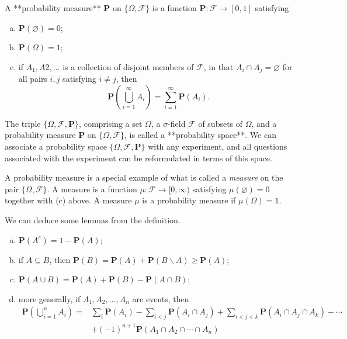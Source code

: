 \begin{definition}
A **probability measure** $\mathbf{P}$ on $\{ \Omega, \mathcal{F} \}$ is a function $\mathbf{P} : \mathcal{F} \to [0,1]$ satisfying
\begin{enumerate}[(a)]
    \item $\mathbf{P}(\varnothing) = 0$;
    \item $\mathbf{P}(\Omega) = 1$;
    \item  if $A_1, A2, \dots$ is a collection of disjoint members of $\mathcal{F}$, in that $A_i \cap A_j = \varnothing$ for all pairs $i, j$ satisfying $i \neq j$, then
    \begin{equation*}
        \mathbf{P}\left( \bigcup_{i=1}^\infty A_i \right) = \sum_{i=1}^\infty \mathbf{P} (A_i).
    \end{equation*}
\end{enumerate}
\end{definition}
The triple $\{ \Omega, \mathcal{F}, \mathbf{P} \}$, comprising a set $\Omega$, a $\sigma$-field $\mathcal{F}$ of subsets of $\Omega$, and a probability measure $\mathbf{P}$ on $\{\Omega, \mathcal{F}\}$, is called a **probability space**. We can associate a probability space $\{ \Omega, \mathcal{F}, \mathbf{P} \}$ with any experiment, and all questions associated with the experiment can be reformulated in terms of this space. 

\begin{remark}
A probability measure is a special example of what is called a \emph{measure} on the pair $\{\Omega, \mathcal{F}\}$. A measure is a function $\mu: \mathcal{F} \to [0, \infty)$ satisfying $\mu(\varnothing) = 0$ together with (c) above. A measure $\mu$ is a probability measure if $\mu(\Omega) = 1$. 
\end{remark}

\begin{lemma}
We can deduce some lemmas from the definition.
\begin{enumerate}[(a)]
    \item $\mathbf{P}(A^c) = 1 - \mathbf{P}(A)$;
    \item if $A \subseteq B$, then $\mathbf{P}(B) = \mathbf{P}(A) + \mathbf{P}(B\backslash A) \geq \mathbf{P}(A)$;
    \item $\mathbf{P}(A \cup B) = \mathbf{P}(A) + \mathbf{P}(B) - \mathbf{P}(A \cap B)$;
    \item more generally, if $A_1, A_2, \dots, A_n$ are events, then 
    \begin{equation*}
        \begin{split}
        \mathbf{P}\left( \bigcup_{i=1}^n A_i \right) =& \sum_{i}\mathbf{P}(A_i) - \sum_{i < j} \mathbf{P}(A_i \cap A_j) + \sum_{i<j<k} \mathbf{P}(A_i \cap A_j \cap A_k) - \cdots \\
        & +(-1)^{n+1} \mathbf{P}(A_1 \cap A_2 \cap \cdots \cap A_n)
        \end{split}
    \end{equation*}
\end{enumerate}
\end{lemma}

